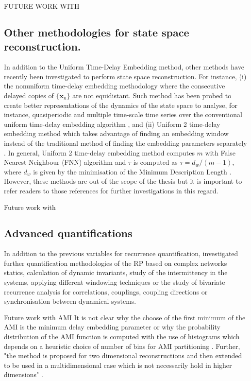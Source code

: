 FUTURE WORK WITH
\subsection{Other methodologies for state space reconstruction.}
In addition to the Uniform Time-Delay Embedding method, other methods have 
recently been investigated to perform state space reconstruction.
For instance, (i) the nonuniform time-delay embedding methodology  
where the consecutive delayed copies of $\{ \boldsymbol{x}_n  \} $ are not
equidistant. Such method has been probed to create better representations 
of the dynamics of the state space to analyse, for instance, 
quasiperiodic and multiple time-scale time series over the conventional 
uniform time-delay embedding algorithm \citep{pecora2007, uzal2011, 
Quintana-Duque2012, Quintana-Duque2013, Quintana-Duque2016}, and
(ii) Uniform 2 time-delay embedding method which takes advantage 
of finding an embedding window instead of the traditional method 
of finding the embedding parameters separately \citep{gomezgarcia2014}.
In general, Uniform 2 time-delay embedding method computes $m$ with 
False Nearest Neighbour (FNN) algorithm and $\tau$ is computed as 
$\tau= d_w / (m-1)$, where $d_w$ is given by the minimisation of the 
Minimum Description Length \citep{small2004}.
However, these methods are out of the scope of the thesis but it is 
important to refer readers to those references for further investigations  
in this regard.


Future work with 
\subsection{Advanced quantifications}
In addition to the previous variables for recurrence quantification, 
\cite{marwan2007, marwan2015} investigated further quantification methodologies 
of the RP based on complex networks statics, calculation of dynamic invariants, 
study of the intermittency in the systems, applying different windowing techniques or the study of bivariate recurrence analysis for correlations, 
couplings, coupling directions or synchronisation between dynamical systems.



Future work with AMI
It is not clear why the choose of the first minimum of the AMI is the 
minimum delay embedding parameter \citep{kantz2003} or why the probability 
distribution of the AMI function is computed with the use of histograms 
which depends on a heuristic choice of number of bins for AMI partitioning 
\citep{garcia2005e71}. Further, "the method is proposed for two dimensional 
reconstructions and then extended to be used in a multidimensional case 
which is not necessarily hold in higher dimensions" 
\citep[p. 156]{gomezgarcia2014}.



